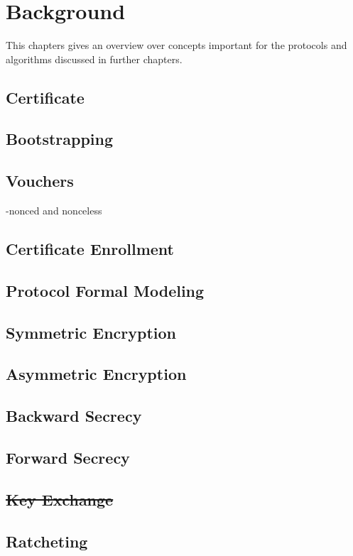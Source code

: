 \chapter{Background}
\label{ch:background}

This chapters gives an overview over concepts important for the protocols and algorithms discussed in further chapters.

\section{Certificate}

\section{Bootstrapping}

\section{Vouchers}
-nonced and nonceless

\section{Certificate Enrollment}

\section{Protocol Formal Modeling}

\section{Symmetric Encryption}

\section{Asymmetric Encryption}

\section{Backward Secrecy}

\section{Forward Secrecy}

\section{\sout{Key Exchange}}

\section{Ratcheting}





